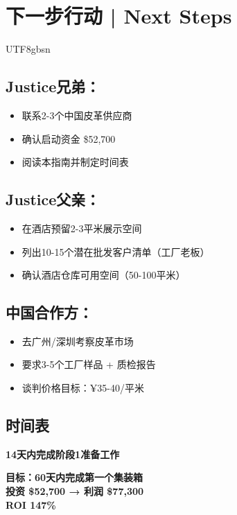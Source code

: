 \documentclass[12pt,a4paper]{article}
\begin{document}
\newpage

\section{下一步行动 | Next Steps}

\begin{CJK}{UTF8}{gbsn}

\subsection{Justice兄弟：}
\begin{itemize}
    \item[$\square$] 联系2-3个中国皮革供应商
    \item[$\square$] 确认启动资金 \$52,700
    \item[$\square$] 阅读本指南并制定时间表
\end{itemize}

\subsection{Justice父亲：}
\begin{itemize}
    \item[$\square$] 在酒店预留2-3平米展示空间
    \item[$\square$] 列出10-15个潜在批发客户清单（工厂老板）
    \item[$\square$] 确认酒店仓库可用空间（50-100平米）
\end{itemize}

\subsection{中国合作方：}
\begin{itemize}
    \item[$\square$] 去广州/深圳考察皮革市场
    \item[$\square$] 要求3-5个工厂样品 + 质检报告
    \item[$\square$] 谈判价格目标：¥35-40/平米
\end{itemize}

\subsection{时间表}

\textbf{14天内完成阶段1准备工作}

\begin{center}
\begin{tcolorbox}[colback=highlightgreen!10,colframe=highlightgreen,width=0.9\textwidth]
\textbf{\Large 目标：60天内完成第一个集装箱}\\[0.3cm]
\textbf{\Large 投资 \$52,700 → 利润 \$77,300}\\[0.3cm]
\textbf{\Large ROI 147\%}
\end{tcolorbox}
\end{center}

\end{CJK}
\end{document}
